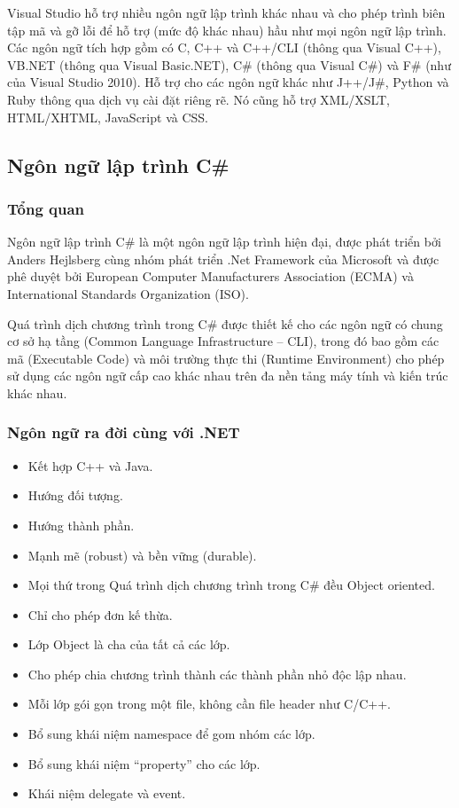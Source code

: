 Visual Studio hỗ trợ nhiều ngôn ngữ lập trình khác nhau và cho phép trình biên tập mã và gỡ lỗi để hỗ trợ (mức độ khác nhau) hầu như mọi ngôn ngữ lập trình. Các ngôn ngữ tích hợp gồm có C, C++ và C++/CLI (thông qua Visual C++), VB.NET (thông qua Visual Basic.NET), C\#  (thông qua Visual C\#) và F\# (như của Visual Studio 2010). Hỗ trợ cho các ngôn ngữ khác như J++/J\#, Python và Ruby thông qua dịch vụ cài đặt riêng rẽ. Nó cũng hỗ trợ XML/XSLT, HTML/XHTML, JavaScript và CSS.

\subsection*{Ngôn ngữ lập trình C\# }
\subsubsection*{Tổng quan}
Ngôn ngữ lập trình C\# là một ngôn ngữ lập trình hiện đại, được phát triển bởi Anders Hejlsberg cùng nhóm phát triển .Net Framework của Microsoft và được phê duyệt bởi European Computer Manufacturers Association (ECMA) và International Standards Organization (ISO).

Quá trình dịch chương trình trong C\# được thiết kế cho các ngôn ngữ có chung cơ sở hạ tầng (Common Language Infrastructure – CLI), trong đó bao gồm các mã (Executable Code) và môi trường thực thi (Runtime Environment) cho phép sử dụng các ngôn ngữ cấp cao khác nhau trên đa nền tảng máy tính và kiến trúc khác nhau.

\subsubsection*{Ngôn ngữ ra đời cùng với .NET}
\begin{itemize}
	\item Kết hợp C++ và Java.
	\item Hướng đối tượng.
	\item Hướng thành phần.
	\item Mạnh mẽ (robust) và bền vững (durable).
	\item Mọi thứ trong Quá trình dịch chương trình trong C\#  đều Object oriented.
	\item Chỉ cho phép đơn kế thừa.
	\item Lớp Object là cha của tất cả các lớp.
	\item Cho phép chia chương trình thành các thành phần nhỏ độc lập nhau.
	\item Mỗi lớp gói gọn trong một file, không cần file header như C/C++.
	\item Bổ sung khái niệm namespace để gom nhóm các lớp.
	\item Bổ sung khái niệm “property” cho các lớp.
	\item Khái niệm delegate và event.
\end{itemize}

